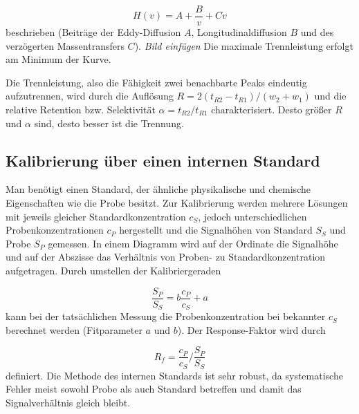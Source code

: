       \begin{equation}
        H(v) = A + \frac{B}{v} + C v
      \end{equation}
    beschrieben (Beiträge der Eddy-Diffusion $A$, Longitudinaldiffusion $B$ und des verzögerten Massentransfers $C$). \textit{Bild einfügen} Die maximale Trennleistung erfolgt am Minimum der Kurve. 
    
    Die Trennleistung, also die Fähigkeit zwei benachbarte Peaks eindeutig aufzutrennen, wird durch die Auflösung $R = 2\left(t_{R2} - t_{R1}\right) / \left(w_2 + w_1\right)$ und die relative Retention bzw. Selektivität $\alpha = t_{R2} / t_{R1}$ charakterisiert. Desto größer $R$ und $\alpha$ sind, desto  besser ist die Trennung. \citep{Versuchsvorschrift}
    
  \subsection{Kalibrierung über einen internen Standard}
  
    Man benötigt einen Standard, der ähnliche physikalische und chemische Eigenschaften wie die Probe besitzt. Zur Kalibrierung werden mehrere Lösungen mit jeweils gleicher Standardkonzentration $c_{S}$, jedoch unterschiedlichen Probenkonzentrationen $c_{P}$ hergestellt und die Signalhöhen von Standard $S_{S}$ und Probe $S_{P}$ gemessen. In einem Diagramm wird auf der Ordinate die Signalhöhe und auf der Abszisse das Verhältnis von Proben- zu Standardkonzentration aufgetragen. Durch umstellen der Kalibriergeraden 
    
      \begin{equation}
        \frac{S_{P}}{S_{S}} = b \frac{c_{P}}{c_{S}} + a
      \end{equation}
    kann bei der tatsächlichen Messung die Probenkonzentration bei bekannter $c_S$ berechnet werden (Fitparameter $a$ und $b$). Der Response-Faktor wird durch
    
      \begin{equation}
        R_f = \frac{c_{P}}{c_{S}} / \frac{S_{P}}{S_{S}}
      \end{equation}
    definiert. Die Methode des internen Standards ist sehr robust, da systematische Fehler meist sowohl Probe als auch Standard betreffen und damit das Signalverhältnis gleich bleibt. \citep{AnalytikIII} 
    
      